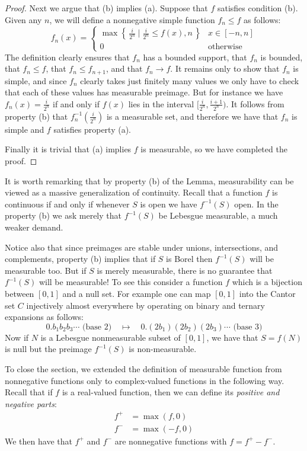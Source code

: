 \documentclass[11pt,oneside]{amsbook}
\newcommand{\set}[1]{\left\{\,#1\,\right\}}
\theoremstyle{definition}
\theoremstyle{plain}
\theoremstyle{definition}
\theoremstyle{remark}
\numberwithin{equation}{section}
\numberwithin{figure}{section}
\begin{document}
\begin{proof}
  Next we argue that (b) implies (a). Suppose that $f$ satisfies condition (b). Given any $n$, we will define a nonnegative simple function $f_n\leq f$ as follows:
  \[f_n(x)=
    \begin{cases}
      \max\set{\frac{i}{2^n}\mid \frac{i}{2^n}\leq f(x),n}&x\in[-n,n]\\
      0&\text{otherwise}
    \end{cases}
  \]
  The definition clearly ensures that $f_n$ has a bounded support, that $f_n$ is bounded, that $f_n\leq f$, that $f_n\leq f_{n+1}$, and that $f_n\to f$. It remains only to show that $f_n$ is simple, and since $f_n$ clearly takes just finitely many values we only have to check that each of these values has measurable preimage. But for instance we have $f_n(x)=\frac{i}{2^n}$ if and only if $f(x)$ lies in the interval $[\frac{i}{2^n},\frac{i+1}{2^n})$. It follows from property (b) that $f_n^{-1}(\frac{i}{2^n})$ is a measurable set, and therefore we have that $f_n$ is simple and $f$ satisfies property (a).

  Finally it is trivial that (a) implies $f$ is measurable, so we have completed the proof.
\end{proof}

It is worth remarking that by property (b) of the Lemma, measurability can be viewed as a massive generalization of continuity. Recall that a function $f$ is continuous if and only if whenever $S$ is open we have $f^{-1}(S)$ open. In the property (b) we ask merely that $f^{-1}(S)$ be Lebesgue measurable, a much weaker demand.

Notice also that since preimages are stable under unions, intersections, and complements, property (b) implies that if $S$ is Borel then $f^{-1}(S)$ will be measurable too. But if $S$ is merely measurable, there is no guarantee that $f^{-1}(S)$ will be measurable! To see this consider a function $f$ which is a bijection between $[0,1]$ and a null set. For example one can map $[0,1]$ into the Cantor set $C$ injectively almost everywhere by operating on binary and ternary expansions as follows:
\[0.b_1b_2b_3\cdots\text{ (base 2)}\quad\mapsto\quad 0.(2b_1)(2b_2)(2b_3)\cdots\text{ (base 3)}
\]
Now if $N$ is a Lebesgue nonmeasurable subset of $[0,1]$, we have that $S=f(N)$ is null but the preimage $f^{-1}(S)$ is non-measurable.

To close the section, we extended the definition of measurable function from nonnegative functions only to complex-valued functions in the following way. Recall that if $f$ is a real-valued function, then we can define its \emph{positive and negative parts}:
\begin{align*}
  f^+&=\max(f,0)\\
  f^-&=\max(-f,0)
\end{align*}
We then have that $f^+$ and $f^-$ are nonnegative functions with $f=f^+-f^-$.
\end{document}
